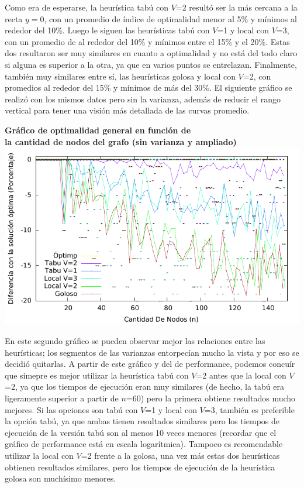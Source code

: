 \par{Como era de esperarse, la heurística tabú con $V$=2 resultó
ser la más cercana a la recta $y=0$, con un promedio de índice de
optimalidad menor al 5\% y mínimos al rededor del 10\%. Luego le
siguen las heurísticas tabú con $V$=1 y local con $V$=3, con un
promedio de al rededor del 10\% y mínimos entre el 15\% y el 20\%.
Estas dos resultaron ser muy similares en cuanto a optimalidad y
no está del todo claro si alguna es superior a la otra, ya que en
varios puntos se entrelazan. Finalmente, también muy similares entre
sí, las heurísticas golosa y local con $V$=2, con promedios al
rededor del 15\% y mínimos de más del 30\%. El siguiente gráfico
se realizó con los mismos datos pero sin la varianza, además de
reducir el rango vertical para tener una visión más detallada de
las curvas promedio.}
\newpage
\begin{center}
\textbf{Gráfico de optimalidad general en función de\\la cantidad
de nodos del grafo (sin varianza y ampliado)}
\includegraphics[scale=1.3]{imgs/super_opt_150_2_10_p.pdf}
\end{center}

\par{En este segundo gráfico se pueden observar mejor las relaciones entre las
heurísticas; los segmentos de las varianzas entorpecían mucho la vista y por eso
se decidió quitarlas. A partir de este gráfico y del de performance, podemos
concuír que simepre es mejor utilizar la heurística tabú con $V$=2 antes que la
local con $V$=2, ya que los tiempos de ejecución eran muy similares (de hecho,
la tabú era ligeramente superior a partir de $n$=60) pero la primera obtiene
resultados mucho mejores. Si las opciones son tabú con $V$=1 y local con $V$=3,
también es preferible la opción tabú, ya que ambas tienen resultados similares
pero los tiempos de ejecución de la versión tabú son al menos 10 veces menores
(recordar que el gráfico de performance está en escala logarítmica). Tampoco
es recomendable utilizar la local con $V$=2 frente a la golosa, una vez más
estas dos heurísticas obtienen resultados similares, pero los tiempos de
ejecución de la heurística golosa son muchísimo menores.}\\

